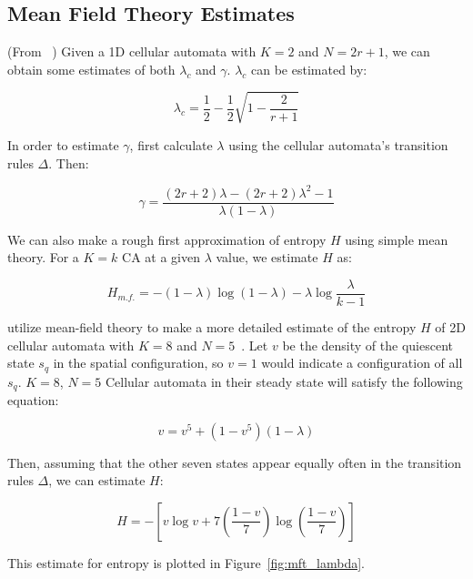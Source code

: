 \documentclass[a4paper,11pt,twoside]{report}
\begin{document}
\begin{appendices}
\section{Mean Field Theory Estimates}
\label{appA:MFT}
(From \citeauthor{li90b}~\cite{li90b}) Given a 1D cellular automata with $K=2$ and $N = 2r+1$, we can obtain some estimates of both $\lambda_c$ and $\gamma$. $\lambda_c$ can be estimated by:

\begin{equation}
\lambda_c = \frac{1}{2} - \frac{1}{2}\sqrt{1 - \frac{2}{r+1}}
\end{equation}

In order to estimate $\gamma$, first calculate $\lambda$ using the cellular automata's transition rules $\Delta$. Then:

\begin{equation}
\gamma = \frac{(2r+2)\lambda - (2r + 2)\lambda^2 - 1}{\lambda(1-\lambda)}
\end{equation}

We can also make a rough first approximation of entropy $H$ using simple mean theory. For a $K=k$ CA at a given $\lambda$ value, we estimate $H$ as:

\begin{equation}
H_{m.f.} = - (1- \lambda) \log (1-\lambda) - \lambda \log \frac{\lambda}{k-1}
\end{equation}

\citeauthor{wo90} utilize mean-field theory to make a more detailed estimate of the entropy $H$ of 2D cellular automata with $K=8$ and $N=5$~\cite{wo90}. Let $v$ be the density of the quiescent state $s_q$ in the spatial configuration, so $v=1$ would indicate a configuration of all $s_q$. $K=8$, $N=5$ Cellular automata in their steady state will satisfy the following equation:

\begin{equation}
v = v^5 + (1 - v^5)(1- \lambda)
\end{equation}

Then, assuming that the other seven states appear equally often in the transition rules $\Delta$, we can estimate $H$:

\begin{equation}
H = -\left[ v \log v + 7\left(\frac{1-v}{7}\right)\log\left(\frac{1-v}{7}\right)\right]
\end{equation}

This estimate for entropy is plotted in Figure~\ref{fig:mft_lambda}.


\end{appendices}
\end{document}
